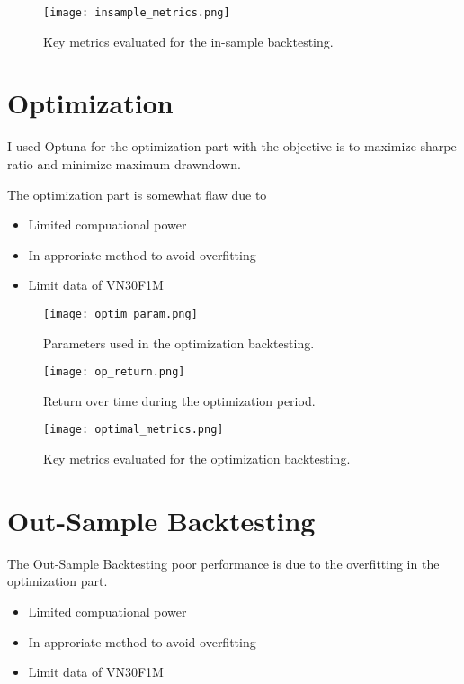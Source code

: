 \documentclass[a4paper,12pt]{article}
\begin{document}
\begin{figure}[h!]
    \centering
    \texttt{[image: insample\_metrics.png]}
    \caption{Key metrics evaluated for the in-sample backtesting.}
    \label{fig:key_metrics}
\end{figure}
\clearpage

\section{Optimization}
I used Optuna for the optimization part with the objective is to maximize sharpe ratio and minimize maximum drawndown.

The optimization part is somewhat flaw due to 
\begin{itemize}
    \item Limited compuational power
    \item In approriate method to avoid overfitting
    \item Limit data of VN30F1M
\end{itemize}
\begin{figure}[h!]
    \centering
    \texttt{[image: optim\_param.png]}
    \caption{Parameters used in the optimization backtesting.}
    \label{fig:parameters}
\end{figure}


\begin{figure}[h!]
    \centering
    \texttt{[image: op\_return.png]}
    \caption{Return over time during the optimization period.}
    \label{fig:return_over_time}
\end{figure}


\begin{figure}[h!]
    \centering
    \texttt{[image: optimal\_metrics.png]}
    \caption{Key metrics evaluated for the optimization backtesting.}
    \label{fig:key_metrics}
\end{figure}
\clearpage

\section{Out-Sample Backtesting}
The Out-Sample Backtesting poor performance is due to the overfitting in the optimization part.
\begin{itemize}
    \item Limited compuational power
    \item In approriate method to avoid overfitting
    \item Limit data of VN30F1M
\end{itemize}
\end{document}

